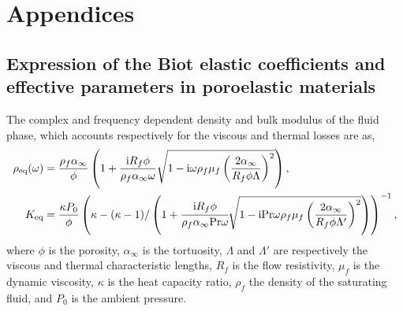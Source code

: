 
\section{Appendices}
\renewcommand{\thesubsection}{\thesection.\Alph{subsection}}
\subsection{Expression of the Biot elastic coefficients and effective parameters in poroelastic materials} \label{app:coefs}

The complex and frequency dependent density and bulk modulus of the fluid phase, which
accounts respectively for the viscous and thermal losses are \cite{johnson1987,champoux1991} as,
\begin{equation}
\begin{aligned}
 \rho_{\text{eq}}(\omega) &= \frac{\rho_{f} \alpha_{\infty}}{\phi}\left(1+\frac{\textrm{i}R_f \phi}{\rho_f \alpha_\infty\omega} \sqrt{1- \mathrm i  \omega  \rho_{f} \mu_f \left(\frac{ 2\alpha_{\infty}}{R_f \phi \Lambda}\right)^2 }\right),\\
K_{\text{eq}} &=\frac{\kappa P_{0}}{\phi}\left(\kappa-(\kappa-1)/\left(1+ \cfrac{\mathrm{i}R_f \phi}{\rho_f \alpha_\infty\text{Pr} \omega} \sqrt{1- \mathrm i\text{Pr} \omega \rho_{f} \mu_f\left( \frac{ 2\alpha_{\infty}}{R_f \phi \Lambda^{\prime}}\right)^2 }\right)\right)^{-1}, 
\end{aligned}
\end{equation}
where $\phi$ is the porosity, $\alpha_{\infty}$ is the tortuosity, $\Lambda$ and $\Lambda'$ are respectively the viscous and thermal characteristic lengths, $R_f$ is the flow resistivity, $\mu_f$ is the dynamic viscosity, $\kappa$ is the heat capacity ratio, $\rho_f$ the density of the saturating fluid, and $P_0$ is the ambient pressure.

